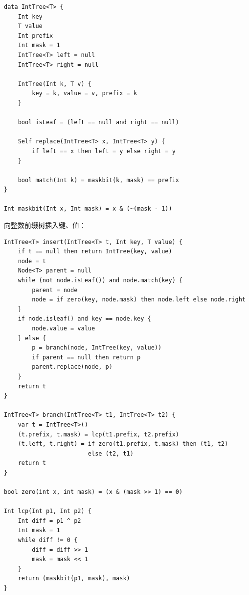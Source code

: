 \documentclass[b5paper]{ctexart}
\begin{document}
\begin{lstlisting}[language = Bourbaki]
data IntTree<T> {
    Int key
    T value
    Int prefix
    Int mask = 1
    IntTree<T> left = null
    IntTree<T> right = null

    IntTree(Int k, T v) {
        key = k, value = v, prefix = k
    }

    bool isLeaf = (left == null and right == null)

    Self replace(IntTree<T> x, IntTree<T> y) {
        if left == x then left = y else right = y
    }

    bool match(Int k) = maskbit(k, mask) == prefix
}

Int maskbit(Int x, Int mask) = x & (~(mask - 1))
\end{lstlisting}

向整数前缀树插入键、值：

\begin{lstlisting}[language = Bourbaki]
IntTree<T> insert(IntTree<T> t, Int key, T value) {
    if t == null then return IntTree(key, value)
    node = t
    Node<T> parent = null
    while (not node.isLeaf()) and node.match(key) {
        parent = node
        node = if zero(key, node.mask) then node.left else node.right
    }
    if node.isleaf() and key == node.key {
        node.value = value
    } else {
        p = branch(node, IntTree(key, value))
        if parent == null then return p
        parent.replace(node, p)
    }
    return t
}

IntTree<T> branch(IntTree<T> t1, IntTree<T> t2) {
    var t = IntTree<T>()
    (t.prefix, t.mask) = lcp(t1.prefix, t2.prefix)
    (t.left, t.right) = if zero(t1.prefix, t.mask) then (t1, t2)
                        else (t2, t1)
    return t
}

bool zero(int x, int mask) = (x & (mask >> 1) == 0)

Int lcp(Int p1, Int p2) {
    Int diff = p1 ^ p2
    Int mask = 1
    while diff != 0 {
        diff = diff >> 1
        mask = mask << 1
    }
    return (maskbit(p1, mask), mask)
}
\end{lstlisting}

\end{document}
